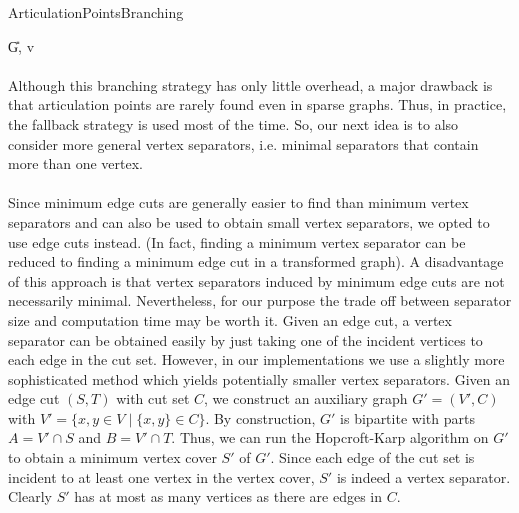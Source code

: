 \documentclass[]{article}
\begin{document}
\begin{algorithm}
	\caption{ArticulationPointsBranching}\label{alg:artic_strat}
	\DontPrintSemicolon
	
	
	\U{G, v}	
	
	
\end{algorithm}



\paragraph{}
Although this branching strategy has only little overhead, a major drawback  is that articulation points are rarely found even in sparse graphs. Thus, in practice, the fallback strategy is used most of the time. So, our next idea is to also consider more general vertex separators, i.e. minimal separators that contain more than one vertex. 
\paragraph{}
Since minimum edge cuts are generally easier to find than minimum vertex separators and can also be used to obtain small vertex separators, we opted to use edge cuts instead. (In fact, finding a minimum vertex separator can be reduced to finding a minimum edge cut in a transformed graph). A disadvantage of this approach is that vertex separators induced by minimum edge cuts are not necessarily minimal. Nevertheless, for our purpose the trade off between separator size and computation time may be worth it. Given an edge cut, a vertex separator can be obtained easily by just taking one of the incident vertices to each edge in the cut set. However, in our implementations we use a slightly more sophisticated method which yields potentially smaller vertex separators. Given an edge cut $(S,T)$ with cut set $C$, we construct an auxiliary graph $G'=(V',C)$  with $V' = \{x,y\in V\;|\;\{x,y\}\in C\}$. By construction, $G'$ is bipartite with parts $A = V'\cap S$ and $B = V'\cap T$. Thus, we can run the Hopcroft-Karp algorithm \cite{bibid} on $G'$ to obtain a minimum vertex cover $S'$ of $G'$. Since each edge of the cut set is incident to at least one vertex in the vertex cover, $S'$ is indeed a vertex separator. Clearly $S'$ has at most as many vertices as there are edges in $C$.
\end{document}
